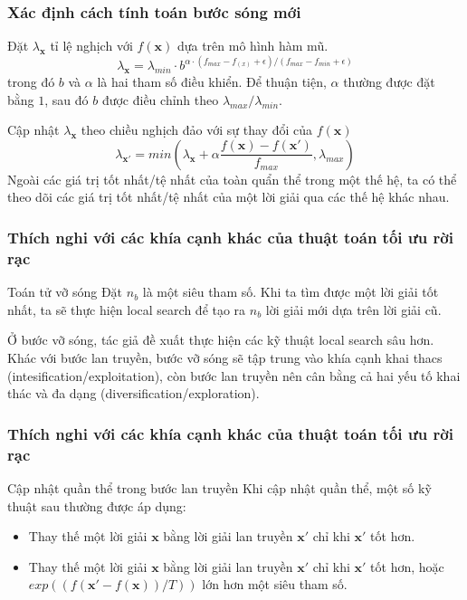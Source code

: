 \begin{frame}
    \frametitle{Xác định cách tính toán bước sóng mới}
    \begin{block}{Đặt $\lambda_{\mathbf{x}}$ tỉ lệ nghịch với $f(\mathbf{x})$ dựa trên mô hình hàm mũ.}
        \begin{equation}
            \label{eq:e5}
            \lambda_{\mathbf{x}} = \lambda_{min} \cdot b^{\alpha \cdot (f_{max} - f_(x) + \epsilon)/(f_{max} - f_{min} + \epsilon)}
        \end{equation}
        trong đó $b$ và $\alpha$ là hai tham số điều khiển. Để thuận tiện, $\alpha$ thường được đặt bằng $1$, sau đó $b$ được điều chỉnh theo $\lambda_{max} / \lambda_{min}$.
    \end{block}
    \begin{block}{Cập nhật $\lambda_{\mathbf{x}}$ theo chiều nghịch đảo với sự thay đổi của $f(\mathbf{x})$}
        \begin{equation}
            \label{eq:e7}
            \lambda_{\mathbf{x'}} = min(\lambda_{\mathbf{x}} + \alpha \frac{f(\mathbf{x}) - f(\mathbf{x'})}{f_{max}}, \lambda_{max})
        \end{equation}
        Ngoài các giá trị tốt nhất/tệ nhất của toàn quẩn thể trong một thế hệ, ta có thể theo dõi các giá trị tốt nhất/tệ nhất của một lời giải qua các thế hệ khác nhau.
    \end{block}
\end{frame}

\begin{frame}
    \frametitle{Thích nghi với các khía cạnh khác của thuật toán tối ưu rời rạc}
    \begin{block}{Toán tử vỡ sóng}
        Đặt $n_b$ là một siêu tham số. Khi ta tìm được một lời giải tốt nhất, ta sẽ thực hiện local search để tạo ra $n_b$ lời giải mới dựa trên lời giải cũ.

        Ở bước vỡ sóng, tác giả đề xuất thực hiện các kỹ thuật local search sâu hơn. Khác với bước lan truyền, bước vỡ sóng sẽ tập trung vào khía cạnh khai thacs (intesification/exploitation), còn bước lan truyền nên cân bằng cả hai yếu tố khai thác và đa dạng (diversification/exploration).
    \end{block}
\end{frame}


\begin{frame}
    \frametitle{Thích nghi với các khía cạnh khác của thuật toán tối ưu rời rạc}
    \begin{block}{Cập nhật quần thể trong bước lan truyền}
        Khi cập nhật quần thể, một số kỹ thuật sau thường được áp dụng:
        \begin{itemize}
            \item Thay thế một lời giải $\mathbf{x}$ bằng lời giải lan truyền $\mathbf{x'}$ chỉ khi $\mathbf{x'}$ tốt hơn.
            \item Thay thế một lời giải $\mathbf{x}$ bằng lời giải lan truyền $\mathbf{x'}$ chỉ khi $\mathbf{x'}$ tốt hơn, hoặc $exp((f(\mathbf{x'} - f(\mathbf{x}))/T))$ lớn hơn một siêu tham số.
        \end{itemize}
    \end{block}
\end{frame}